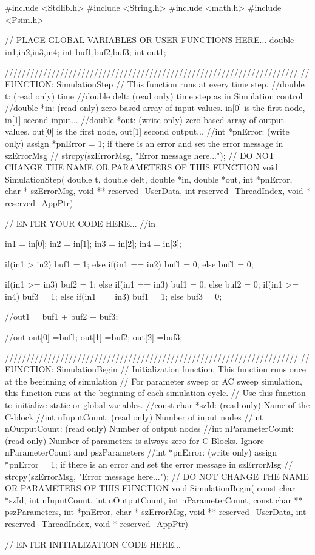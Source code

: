 \begin{mylisting}[language=c,caption=3番レグ用比較モジュール,label=hurokuB_hikakuC]

#include <Stdlib.h>
#include <String.h>
#include <math.h>
#include <Psim.h>

// PLACE GLOBAL VARIABLES OR USER FUNCTIONS HERE...
double in1,in2,in3,in4;
int buf1,buf2,buf3;
int out1;

/////////////////////////////////////////////////////////////////////
// FUNCTION: SimulationStep
//   This function runs at every time step.
//double t: (read only) time
//double delt: (read only) time step as in Simulation control
//double *in: (read only) zero based array of input values. in[0] is the first node, in[1] second input...
//double *out: (write only) zero based array of output values. out[0] is the first node, out[1] second output...
//int *pnError: (write only)  assign  *pnError = 1;  if there is an error and set the error message in szErrorMsg
//    strcpy(szErrorMsg, "Error message here..."); 
// DO NOT CHANGE THE NAME OR PARAMETERS OF THIS FUNCTION
void SimulationStep(
		double t, double delt, double *in, double *out,
		 int *pnError, char * szErrorMsg,
		 void ** reserved_UserData, int reserved_ThreadIndex, void * reserved_AppPtr)
{
// ENTER YOUR CODE HERE...
//in

in1 = in[0];
in2 = in[1];
in3 = in[2];
in4 = in[3];

	if(in1 > in2){
	buf1 = 1;
	}else if(in1 == in2){
	buf1 = 0;
	}else{
	buf1 = 0;
	}

	if(in1 >= in3){
	buf2 = 1;
	}else if(in1 == in3){
	buf1 = 0;
	}else{
	buf2 = 0;
	}
	if(in1 >= in4){
	buf3 = 1;
	}else if(in1 == in3){
	buf1 = 1;
	}else{
	buf3 = 0;
	}
	
	//out1 = buf1 + buf2 + buf3;

//out
out[0] =buf1;
out[1] =buf2;
out[2] =buf3;
}


/////////////////////////////////////////////////////////////////////
// FUNCTION: SimulationBegin
//   Initialization function. This function runs once at the beginning of simulation
//   For parameter sweep or AC sweep simulation, this function runs at the beginning of each simulation cycle.
//   Use this function to initialize static or global variables.
//const char *szId: (read only) Name of the C-block 
//int nInputCount: (read only) Number of input nodes
//int nOutputCount: (read only) Number of output nodes
//int nParameterCount: (read only) Number of parameters is always zero for C-Blocks.  Ignore nParameterCount and pszParameters
//int *pnError: (write only)  assign  *pnError = 1;  if there is an error and set the error message in szErrorMsg
//    strcpy(szErrorMsg, "Error message here..."); 
// DO NOT CHANGE THE NAME OR PARAMETERS OF THIS FUNCTION
void SimulationBegin(
		const char *szId, int nInputCount, int nOutputCount,
		 int nParameterCount, const char ** pszParameters,
		 int *pnError, char * szErrorMsg,
		 void ** reserved_UserData, int reserved_ThreadIndex, void * reserved_AppPtr)
{
// ENTER INITIALIZATION CODE HERE...




}
\end{mylisting}
